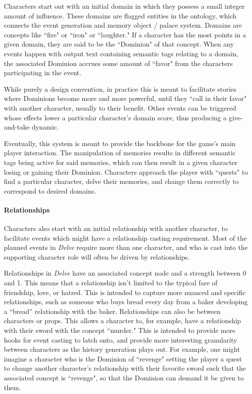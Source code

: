 Characters start out with an initial domain in which they possess a small integer amount of influence. These domains are flagged entities in the ontology, which connects the event generation and memory object / palace system. Domains are concepts like ``fire" or ``iron" or ``laughter." If a character has the most points in a given domain, they are said to be the ``Dominion" of that concept. When any events happen with output text containing semantic tags relating to a domain, the associated Dominion accrues some amount of ``favor" from the characters participating in the event. 

While purely a design convention, in practice this is meant to facilitate stories where Dominions become more and more powerful, until they ``call in their favor" with another character, usually to their benefit. Other events can be triggered whose effects lower a particular character's domain score, thus producing a give-and-take dynamic.

Eventually, this system is meant to provide the backbone for the game's main player interaction. The manipulation of memories results in different semantic tags being active for said memories, which can then result in a given character losing or gaining their Dominion. Characters approach the player with ``quests" to find a particular character, delve their memories, and change them correctly to correspond to desired domains.

\paragraph{Relationships}\label{par:delve-relationships}

Characters also start with an initial relationship with another character, to facilitate events which might have a relationship casting requirement. Most of the planned events in \textit{Delve} require more than one character, and who is cast into the supporting character role will often be driven by relationships.

Relationships in \textit{Delve} have an associated concept node and a strength between 0 and 1. This means that a relationship isn't limited to the typical fare of friendship, love, or hatred. This is intended to capture more nuanced and specific relationships, such as someone who buys bread every day from a baker developing a “bread” relationship with the baker. Relationships can also be between characters or props. This allows a character to, for example, have a relationship with their sword with the concept ``murder." This is intended to provide more hooks for event casting to latch onto, and provide more interesting granularity between characters as the history generation plays out. For example, one might imagine a character who is the Dominion of ``revenge" setting the player a quest to change another character's relationship with their favorite sword such that the associated concept is ``revenge", so that the Dominion can demand it be given to them.

